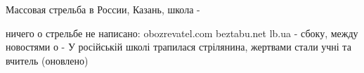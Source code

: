  
 
 
 
 

Массовая стрельба в России, Казань, школа - 

ничего о стрельбе не написано:
obozrevatel.com
beztabu.net
lb.ua - сбоку, между новостями о - 
У російській школі трапилася стрілянина, жертвами стали учні та вчитель (оновлено) 
